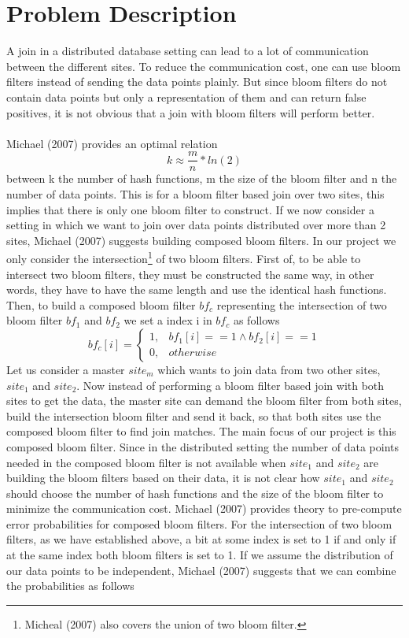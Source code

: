 \documentclass[12]{scrartcl}
\begin{document}
\section{Problem Description}
A join in a distributed database setting can lead to a lot of communication between the different sites. To reduce the communication cost, one can use bloom filters instead of sending the data points plainly. But since bloom filters do not contain data points but only a representation of them and can return false positives, it is not obvious that a join with bloom filters will perform better.\\\\
Michael (2007) provides an optimal relation
\begin{equation}
	k \approx \frac{m}{n}*ln(2)
\end{equation}
between k the number of hash functions, m the size of the bloom filter and n the number of data points. This is for a bloom filter based join over two sites, this implies that there is only one bloom filter to construct. If we now consider a setting in which we want to join over data points distributed over more than 2 sites, Michael (2007) suggests building composed bloom filters. In our project we only consider the intersection\footnote{Micheal (2007) also covers the union of two bloom filter.} of two bloom filters. First of, to be able to intersect two bloom filters, they must be constructed the same way, in other words, they have to have the same length and use the identical hash functions.\\ Then, to build a composed bloom filter $bf_c$ representing the intersection of two bloom filter  $bf_1$ and $bf_2$ we set a index i in $bf_c$ as follows
\begin{equation}
	bf_c[i] = 
	\begin{cases}
	1, & bf_1[i] == 1 \wedge bf_2[i] == 1\\
	0, & otherwise
	\end{cases}
\end{equation}
Let us consider a master $site_m$ which wants to join data from two other sites, $site_1$ and $site_2$. Now instead of performing a bloom filter based join with both sites to get the data, the master site can demand the bloom filter from both sites, build the intersection bloom filter and send it back, so that both sites use the composed bloom filter to find join matches. The main focus of our project is this composed bloom filter. Since in the distributed setting the number of data points needed in the composed bloom filter is not available when $site_1$ and $site_2$ are building the bloom filters based on their data, it is not clear how $site_1$ and $site_2$ should choose the number of hash functions and the size of the bloom filter to minimize the communication cost. Michael (2007) provides theory to pre-compute error probabilities for composed bloom filters. For the intersection of two bloom filters, as we have established above, a bit at some index is set to 1 if and only if at the same index both bloom filters is set to 1. If we assume the distribution of our data points to be independent, Michael (2007) suggests that we can combine the probabilities as follows
\end{document}
